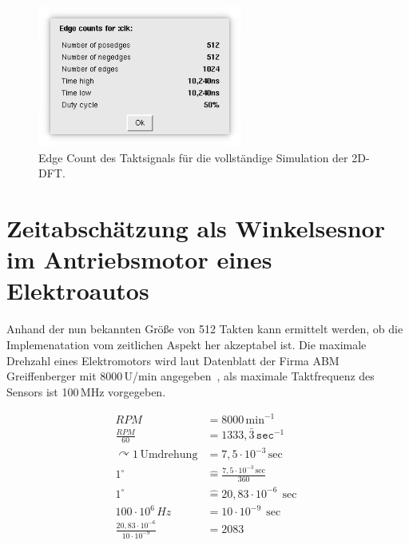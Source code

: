  \begin{figure}[htbp]
  \centering
  \includegraphics[width=0.6\textwidth]{img/Simulation_edge_count_clk.png}
  \caption{Edge Count des Taktsignals für die vollständige Simulation der 2D-DFT.}
 \end{figure}

 \section{Zeitabschätzung als Winkelsesnor im Antriebsmotor eines Elektroautos}
 Anhand der nun bekannten Größe von 512 Takten kann ermittelt werden, ob die Implemenatation vom zeitlichen Aspekt her akzeptabel ist.
 Die maximale Drehzahl eines Elektromotors wird laut Datenblatt der Firma ABM Greiffenberger mit 8000\,U/min angegeben~\autocite[5]{greiffenberger},
 als maximale Taktfrequenz des Sensors ist 100\,MHz vorgegeben.
 


 
 \begin{equation}
 \begin{split}
    RPM &= 8000\, \textrm{min}^{-1}\\[10pt]
    \frac{RPM}{60} &= 1333,\bar{3}\,\texttt{sec}^{-1}  \\[10pt]
    \curvearrowright 1\, \textrm{Umdrehung} &= 7,5\cdot 10^{-3}\,\textrm{sec}\\[10pt]
    1^\circ &\widehat{=} \frac{7,5\cdot 10^{-3}\,\textrm{sec}}{360}\\[10pt]
    1^\circ & \widehat{=} 20,83\cdot10^{-6}\,\sec \\[10pt]
    100\cdot10^6\,Hz &= 10\cdot10^{-9}\,\sec \\[10pt]
    \frac{20,83\cdot10^{-6}}{10\cdot10^{-9}} &= 2083
    \end{split}
 \end{equation}


